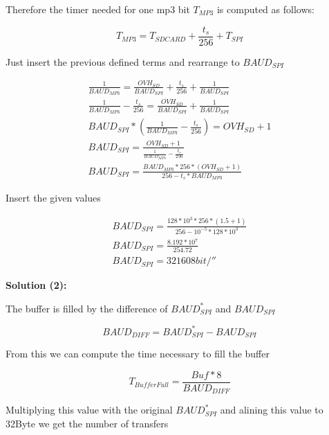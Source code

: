 \documentclass[12pt,a4paper,titlepage,oneside]{article}
\begin{document}
Therefore the timer needed for one mp3 bit ${\mathit T_{MP3}}$ is computed as follows:

\begin{equation}
T_{MP3} = T_{SDCARD} + \frac{t_s}{256} + T_{SPI} 
\end{equation}

Just insert the previous defined terms and rearrange to ${ \mathit BAUD_{SPI}}$

\begin{equation}
\begin{aligned}
\frac{1}{BAUD_{MP3}} = \frac{OVH_{SD}}{BAUD_{SPI}} + \frac{t_s}{256} + \frac{1}{BAUD_{SPI}} \\
\frac{1}{BAUD_{MP3}} - \frac{t_s}{256} = \frac{OVH_{SD}}{BAUD_{SPI}} + \frac{1}{BAUD_{SPI}} \\
BAUD_{SPI}*( \frac{1}{BAUD_{MP3}} - \frac{t_s}{256} ) = OVH_{SD} + 1 \\
BAUD_{SPI} = \frac{OVH_{SD} + 1}{ \frac{1}{BAUD_{MP3}} - \frac{t_s}{256} } \\
BAUD_{SPI} = \frac{ BAUD_{MP3}*256*(OVH_{SD} + 1) }{ 256 - t_s*BAUD_{MP3} }
\end{aligned}
\end{equation}

Insert the given values

\begin{equation}
\begin{aligned}
BAUD_{SPI} = \frac{ 128*10^3*256*(1.5 + 1) }{ 256 - 10^{-5}*128*10^3 } \\
BAUD_{SPI} = \frac{ 8.192*10^7 }{ 254.72 } \\
BAUD_{SPI} = \unit{321608}{bit/\second}
\end{aligned}
\end{equation}

{\bf Solution (2):}

The buffer is filled by the difference of $\mathit{BAUD}_{SPI}^{*}$ and $\mathit{BAUD}_{SPI}$

\begin{equation}
BAUD_{DIFF} = {BAUD}_{SPI}^{*} - BAUD_{SPI}
\end{equation}

From this we can compute the time necessary to fill the buffer

\begin{equation}
T_{BufferFull} = \frac{Buf*8}{BAUD_{DIFF}} 
\end{equation}

Multiplying this value with the original  $\mathit{BAUD}_{SPI}^{*}$ and alining this value to \unit{32}{Byte} we get the number of transfers
\end{document}
